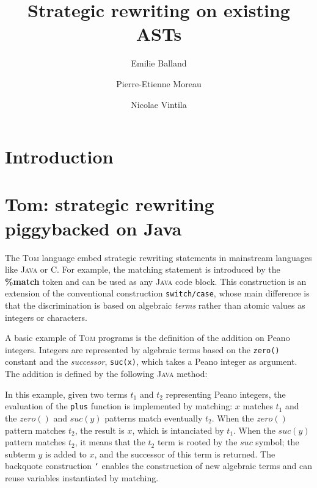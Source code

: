 \documentclass[runningheads]{llncs}
\title{Strategic rewriting on existing ASTs}
\author{Emilie Balland \and Pierre-Etienne Moreau \and Nicolae Vintila}
\institute{INRIA \& LORIA,\\
  BP 101, 54602 Villers-l{\`e}s-Nancy Cedex France\\
\email{\{Emilie.Balland,Pierre-Etienne.Moreau\}@loria.fr,nvintila@yahoo.com}}
\newcommand{\tom}{\textsc{Tom}}
\newcommand{\java}{\textsc{Java}}
\newcommand{\C}{\textsf{C}}
\newcommand{\lex}[1]{{\textrm{\textbf{#1}}}}
\begin{document}
\maketitle

\begin{abstract}

\end{abstract}

\section{Introduction}

\section{Tom: strategic rewriting piggybacked on Java}
	
The {\tom} language embed strategic rewriting statements in  mainstream
languages like {\java} or {\C}.  For example, the matching statement is
introduced by the \lex{\%match} token and can be used as any {\java} code
block.  This construction is an extension of the conventional construction
\texttt{switch/case}, whose main difference is that the discrimination is
based on algebraic \emph{terms} rather than atomic values as integers or
characters.

A basic example of {\tom} programs is the definition of the addition on Peano
integers. Integers are represented by algebraic terms based on the
\texttt{zero()} constant and the \emph{successor}, \texttt{suc(x)},  which
takes a Peano integer as argument.  The addition is defined by the following
{\java} method:

\medskip
{}

In this example, given two terms  $t_1$ and $t_2$ representing Peano integers,
the evaluation of the \texttt{plus} function is implemented by matching: $x$
matches $t_1$ and the $zero()$ and $suc(y)$ patterns match eventually $t_2$.
When the $zero()$ pattern matches $t_2$, the result is $x$, which
is intanciated by $t_1$. When the $suc(y)$ pattern matches $t_2$, it means
that the $t_2$ term is rooted by the $suc$ symbol; the subterm $y$ is added
to $x$, and the successor of this term is returned. The backquote construction
\texttt{`} enables the construction of new algebraic terms and can reuse
variables instantiated by matching.
\end{document}
